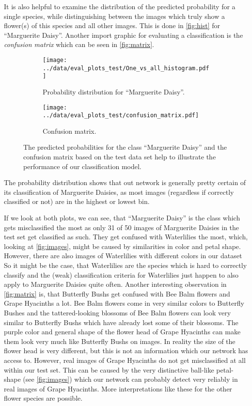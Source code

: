 It is also helpful to examine the distribution of the predicted probability for a single species, while distinguishing between the images which truly show a flower(s) of this species and
all other images.
This is done in \autoref{fig:hist} for \enquote{Marguerite Daisy}.
Another import graphic for evaluating a classification is the \textit{confusion matrix} which can be seen in \autoref{fig:matrix}.
\begin{figure}
    \centering    
    \begin{subfigure}{0.49\textwidth}
        \centering
        \texttt{[image: ../data/eval\_plots\_test/One\_vs\_all\_histogram.pdf]}
        \caption{Probability distribution for \enquote{Marguerite Daisy}.}
        \label{fig:hist}
    \end{subfigure}
    \hfill
    \begin{subfigure}{0.49\textwidth}
        \centering
        \texttt{[image: ../data/eval\_plots\_test/confusion\_matrix.pdf]}
        \caption{Confusion matrix.}
        \label{fig:matrix}
    \end{subfigure}
    \caption{The predicted probabilities for the class \enquote{Marguerite Daisy} and the confusion matrix based on the test data set help to illustrate the performance of our classification model.}
\end{figure}
The probability distribution shows that out network is generally pretty certain of its classification of Marguerite Daisies, as most images (regardless if correctly classified or not) 
are in the highest or lowest bin.

If we look at both plots, we can see, that \enquote{Marguerite Daisy} is the class which gets misclassified the most as only 31 of 50 images of Marguerite Daisies in the test set get 
classified as such.
They get confused with Waterlilies the most, which, looking at \autoref{fig:images}, might be caused by similarities in color and petal shape.
However, there are also images of Waterlilies with different colors in our dataset
So it might be the case, that Waterlilies are the species which is hard to correctly classify and the (weak) classification criteria for Waterlilies just happen to also apply to Marguerite Daisies
quite often.
Another interesting observation in \autoref{fig:matrix} is, that Butterfly Bushs get confused with Bee Balm flowers and Grape Hyacinths a lot.
Bee Balm flowers come in very similar colors to Butterfly Bushes and the tattered-looking blossoms of Bee Balm flowers can look very similar to Butterfly Bushs which have already lost some of their 
blossoms.
The purple color and general shape of the flower head of Grape Hyacinths can make them look very much like Butterfly Bushs on images.
In reality the size of the flower head is very different, but this is not an information which our network has access to.
However, real images of Grape Hyacinths do not get misclassified at all within our test set.
This can be caused by the very distinctive ball-like petal-shape (see \autoref{fig:images}) which our network can probably detect very reliably in real images of Grape Hyacinths.
More interpretations like these for the other flower species are possible.


